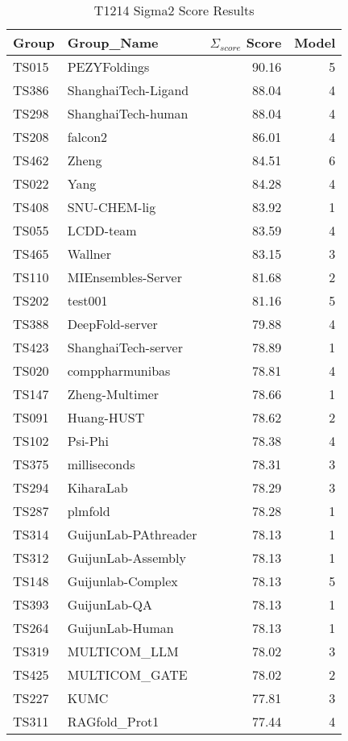 \begin{table*}[ht]
\caption{T1214 Sigma2 Score Results}
\label{tab:T1214_Sigma_score_split}
\scriptsize
\begin{minipage}[t]{0.48\textwidth}
\centering
\begin{tabular}{llrr}
\toprule
Group & Group\_Name & $\Sigma_{score}$ Score & Model \\ 
\midrule
TS015 & PEZYFoldings & 90.16 & 5 \\ 
TS386 & ShanghaiTech-Ligand & 88.04 & 4 \\ 
TS298 & ShanghaiTech-human & 88.04 & 4 \\ 
TS208 & falcon2 & 86.01 & 4 \\ 
TS462 & Zheng & 84.51 & 6 \\ 
TS022 & Yang & 84.28 & 4 \\ 
TS408 & SNU-CHEM-lig & 83.92 & 1 \\ 
TS055 & LCDD-team & 83.59 & 4 \\ 
TS465 & Wallner & 83.15 & 3 \\ 
TS110 & MIEnsembles-Server & 81.68 & 2 \\ 
TS202 & test001 & 81.16 & 5 \\ 
TS388 & DeepFold-server & 79.88 & 4 \\ 
TS423 & ShanghaiTech-server & 78.89 & 1 \\ 
TS020 & comppharmunibas & 78.81 & 4 \\ 
TS147 & Zheng-Multimer & 78.66 & 1 \\ 
TS091 & Huang-HUST & 78.62 & 2 \\ 
TS102 & Psi-Phi & 78.38 & 4 \\ 
TS375 & milliseconds & 78.31 & 3 \\ 
TS294 & KiharaLab & 78.29 & 3 \\ 
TS287 & plmfold & 78.28 & 1 \\ 
TS314 & GuijunLab-PAthreader & 78.13 & 1 \\ 
TS312 & GuijunLab-Assembly & 78.13 & 1 \\ 
TS148 & Guijunlab-Complex & 78.13 & 5 \\ 
TS393 & GuijunLab-QA & 78.13 & 1 \\ 
TS264 & GuijunLab-Human & 78.13 & 1 \\ 
TS319 & MULTICOM\_LLM & 78.02 & 3 \\ 
TS425 & MULTICOM\_GATE & 78.02 & 2 \\ 
TS227 & KUMC & 77.81 & 3 \\ 
TS311 & RAGfold\_Prot1 & 77.44 & 4 \\ 

\end{tabular}
\end{minipage}
\end{table*}
